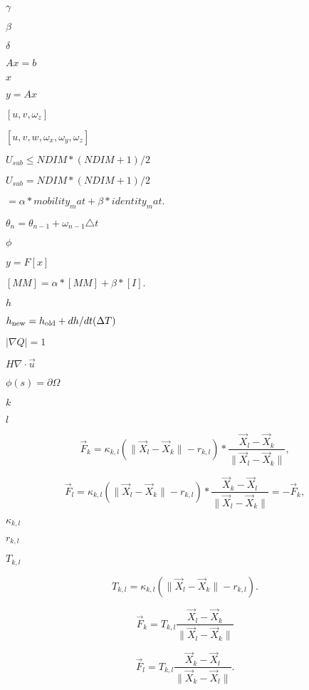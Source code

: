 \documentclass{article}
\begin{document}
$ \gamma $
\pagebreak

$ \beta $
\pagebreak

$ \delta $
\pagebreak

$Ax=b$
\pagebreak

$x$
\pagebreak

$y=Ax$
\pagebreak

$[u,v,\omega_z]$
\pagebreak

$[u,v,w,\omega_x,\omega_y,\omega_z]$
\pagebreak

$ U_{sub} \leq NDIM * (NDIM + 1) / 2 $
\pagebreak

$ U_{sub} = NDIM * (NDIM + 1) / 2 $
\pagebreak

$ = \alpha * mobility_mat + \beta * identity_mat. $
\pagebreak

$ \theta_n = \theta_{n-1} + \omega_{n-1} \triangle t $
\pagebreak

$ \phi $
\pagebreak

$y=F[x]$
\pagebreak

$ [MM] = \alpha*[MM] + \beta*[I]. $
\pagebreak

$ h $
\pagebreak

$ h_{\rm new} = h_{\rm old} + dh/dt (\Delta T) $
\pagebreak

$ |\nabla Q | = 1 $
\pagebreak

$ H \nabla \cdot \vec{u} $
\pagebreak

$ \phi(s) = \partial \Omega $
\pagebreak

$ k $
\pagebreak

$ l $
\pagebreak

\[ \vec{F}_k = \kappa_{k,l} \left( \|\vec{X}_{l} - \vec{X}_{k}\| - r_{k,l} \right) *\frac{\vec{X}_{l} - \vec{X}_{k}}{\|\vec{X}_{l} - \vec{X}_{k}\|}, \]
\pagebreak

\[ \vec{F}_l = \kappa_{k,l} \left( \|\vec{X}_{l} - \vec{X}_{k}\| - r_{k,l} \right) *\frac{\vec{X}_{k} - \vec{X}_{l}}{\|\vec{X}_{l} - \vec{X}_{k}\|} = - \vec{F}_k, \]
\pagebreak

$ \kappa_{k,l} $
\pagebreak

$ r_{k,l} $
\pagebreak

$ T_{k,l} $
\pagebreak

\[ T_{k,l} = \kappa_{k,l} \left( \|\vec{X}_{l} - \vec{X}_{k}\| - r_{k,l} \right). \]
\pagebreak

\[ \vec{F}_k = T_{k,l} \frac{\vec{X}_{l} - \vec{X}_{k}}{\|\vec{X}_{l} - \vec{X}_{k}\|} \]
\pagebreak

\[ \vec{F}_l = T_{k,l} \frac{\vec{X}_{k} - \vec{X}_{l}}{\|\vec{X}_{k} - \vec{X}_{l}\|}. \]
\pagebreak
\end{document}
